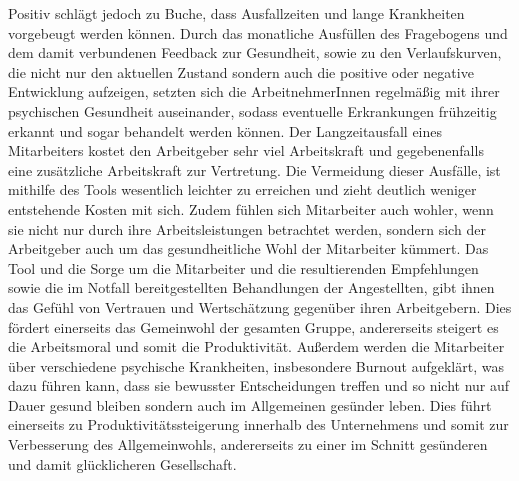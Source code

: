 \documentclass[a4paper,12pt,]{article}
\begin{document}
Positiv schlägt jedoch zu Buche, dass Ausfallzeiten und lange Krankheiten vorgebeugt werden können. Durch das monatliche Ausfüllen des Fragebogens und dem damit verbundenen Feedback zur Gesundheit, sowie zu den Verlaufskurven, die nicht nur den aktuellen Zustand sondern auch die positive oder negative Entwicklung aufzeigen, setzten sich die ArbeitnehmerInnen regelmäßig mit ihrer psychischen Gesundheit auseinander, sodass eventuelle Erkrankungen frühzeitig erkannt und sogar behandelt werden können. Der Langzeitausfall eines Mitarbeiters kostet den Arbeitgeber sehr viel Arbeitskraft und gegebenenfalls eine zusätzliche Arbeitskraft zur Vertretung. Die Vermeidung dieser Ausfälle, ist mithilfe des Tools wesentlich leichter zu erreichen und zieht deutlich weniger entstehende Kosten mit sich.
 Zudem fühlen sich Mitarbeiter auch wohler, wenn sie nicht nur durch ihre Arbeitsleistungen betrachtet werden, sondern sich der Arbeitgeber auch um das gesundheitliche Wohl der Mitarbeiter kümmert. Das Tool und die Sorge um die Mitarbeiter und die resultierenden Empfehlungen sowie die im Notfall bereitgestellten Behandlungen der Angestellten, gibt ihnen  das Gefühl von Vertrauen und Wertschätzung gegenüber ihren Arbeitgebern. Dies fördert einerseits das Gemeinwohl der gesamten Gruppe, andererseits steigert es die Arbeitsmoral und somit die Produktivität.
Außerdem werden die Mitarbeiter über verschiedene psychische Krankheiten, insbesondere Burnout aufgeklärt, was dazu führen kann, dass sie bewusster Entscheidungen treffen und so nicht nur auf Dauer gesund bleiben sondern auch im Allgemeinen gesünder leben. Dies führt einerseits zu Produktivitätssteigerung innerhalb des Unternehmens und somit zur Verbesserung des Allgemeinwohls, andererseits zu einer im Schnitt gesünderen und damit glücklicheren Gesellschaft.
\end{document}
